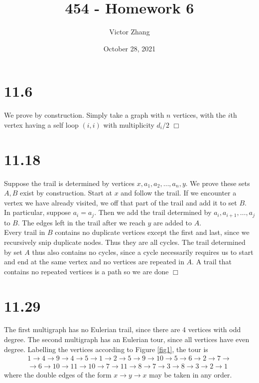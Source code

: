 \documentclass{article}
\title{454 - Homework 6}
\author{Victor Zhang}
\date{October 28, 2021}
\begin{document}
\maketitle

\section*{11.6}
We prove by construction. Simply take a graph with $n$ vertices, with the $i$th vertex having a self loop $(i,i)$ with multiplicity $d_i/2$ $\Box$

\section*{11.18}
Suppose the trail is determined by vertices $x, a_1, a_2, \dots, a_n, y$. We prove these sets $A, B$ exist by construction. Start at $x$ and follow the trail. If we encounter a vertex we have already visited, we  off that part of the trail and add it to set $B$. In particular, suppose $a_i = a_j$. Then we add the trail determined by $a_i, a_{i+1}, \dots, a_{j}$ to $B$. The edges left in the trail after we reach $y$ are added to $A$.\\
Every trail in $B$ contains no duplicate vertices except the first and last, since we recursively snip duplicate nodes. Thus they are all cycles. The trail determined by set $A$ thus also contains no cycles, since a cycle necessarily requires us to start and end at the same vertex and no vertices are repeated in $A$. A trail that contains no repeated vertices is a path so we are done $\Box$

\section*{11.29}
The first multigraph has no Eulerian trail, since there are 4 vertices with odd degree. The second multigraph has an Eulerian tour, since all vertices have even degree. Labelling the vertices according to Figure \ref{fig1}, the tour is
\begin{gather*}
1 \to 4 \to 9 \to 4 \to 5 \to 1 \to 2 \to 5 \to 9 \to 10 \to 5 \to 6 \to 2 \to 7 \to\\
\to 6 \to 10 \to 11 \to 10 \to 7 \to 11 \to 8 \to 7 \to 3 \to 8 \to 3 \to 2 \to 1
\end{gather*}
where the double edges of the form $x \to y \to x$ may be taken in any order.
\end{document}

